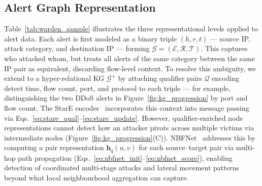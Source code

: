 \documentclass[10pt,journal,compsoc]{IEEEtran}
\begin{document}
\subsection{Alert Graph Representation}
\label{ssec:alert_model}
Table~\ref{tab:warden_sample} illustrates the three
representational levels applied to alert data.
Each alert is first modeled as a binary triple
$(h, r, t)$ --- source IP, attack category, and
destination IP --- forming $\mathcal{G} =
(\mathcal{E}, \mathcal{R}, \mathcal{T})$. This
captures who attacked whom, but treats all alerts
of the same category between the same IP pair as
equivalent, discarding flow-level context.
To resolve this ambiguity, we extend to a
hyper-relational KG $\mathcal{G}^+$ by attaching
qualifier pairs $\mathcal{Q}$ encoding detect time,
flow count, port, and protocol to each triple ---
for example, distinguishing the two DDoS alerts in
Figure~\ref{fig:kg_progression} by port and flow count.
The StarE encoder~\cite{galkin2020message} incorporates
this context into message passing via
Eqs.~\eqref{eq:stare_qual}--\eqref{eq:stare_update}.
However, qualifier-enriched node representations
cannot detect how an attacker pivots across multiple
victims via intermediate nodes
(Figure~\ref{fig:kg_progression}(C)).
NBFNet~\cite{zhu2021neural} addresses this by
computing a pair representation $\mathbf{h}_q(u,v)$
for each source--target pair via multi-hop path
propagation
(Eqs.~\eqref{eq:nbfnet_init}--\eqref{eq:nbfnet_score}),
enabling detection of coordinated multi-stage attacks
and lateral movement patterns beyond what local
neighbourhood aggregation can capture.
\end{document}
